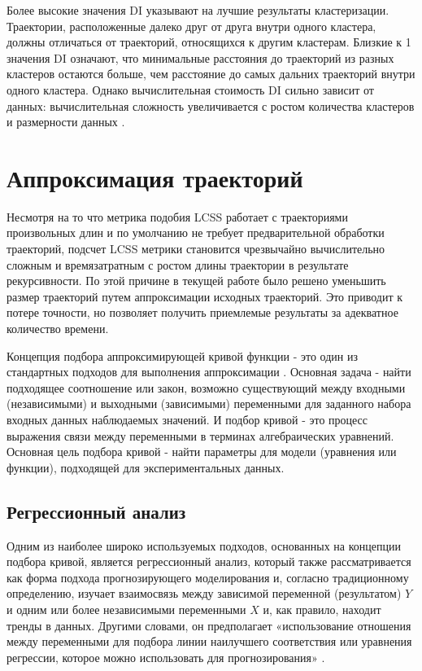 Более высокие значения DI указывают на лучшие результаты кластеризации. Траектории, расположенные далеко друг от друга внутри одного кластера, должны отличаться от траекторий, относящихся к другим кластерам. Близкие к 1 значения DI означают, что минимальные расстояния до траекторий из разных кластеров остаются больше, чем расстояние до самых дальних траекторий внутри одного кластера. Однако вычислительная стоимость DI сильно зависит от данных: вычислительная сложность увеличивается с ростом количества кластеров и размерности данных \cite{online:dunn_cl_valid}.

\section{Аппроксимация траекторий}

Несмотря на то что метрика подобия LCSS работает с траекториями произвольных длин и по умолчанию не требует предварительной обработки траекторий, подсчет LCSS метрики становится чрезвычайно вычислительно сложным и времязатратным с ростом длины траектории в результате рекурсивности. По этой причине в текущей работе было решено уменьшить размер траекторий путем аппроксимации исходных траекторий. Это приводит к потере точности, но позволяет получить приемлемые результаты за адекватное количество времени.

Концепция подбора аппроксимирующей кривой функции - это один из стандартных подходов для выполнения аппроксимации \cite{article:behav_form_extr}. Основная задача - найти подходящее соотношение или закон, возможно существующий между входными (независимыми) и выходными (зависимыми) переменными для заданного набора входных данных наблюдаемых значений. И подбор кривой - это процесс выражения связи между переменными в терминах алгебраических уравнений. Основная цель подбора кривой - найти параметры для модели (уравнения или функции), подходящей для экспериментальных данных.

\subsection{Регрессионный анализ}

Одним из наиболее широко используемых подходов, основанных на концепции подбора кривой, является регрессионный анализ, который также рассматривается как форма подхода прогнозирующего моделирования и, согласно традиционному определению, изучает взаимосвязь между зависимой переменной (результатом) $Y$ и одним или более независимыми переменными $X$ и, как правило, находит тренды в данных. Другими словами, он предполагает «использование отношения между переменными для подбора линии наилучшего соответствия или уравнения регрессии, которое можно использовать для прогнозирования» \cite{online:intro_lr_pr}.

